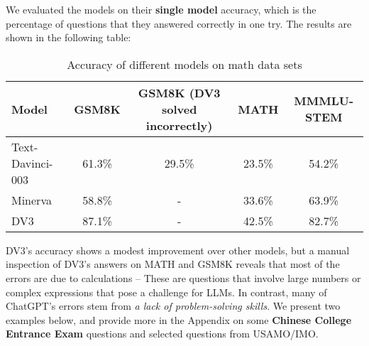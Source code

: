 We evaluated the models on their \textbf{single model} accuracy, which is the percentage of questions that they answered correctly in one try. The results are shown in the following table:

\begin{table}[h]
\centering
\begin{tabular}{lcccc}
\hline
Model & GSM8K & GSM8K (DV3 solved incorrectly) & MATH  & MMMLU-STEM\\
\hline
Text-Davinci-003 & 61.3\%  & 29.5\% & 23.5\% &54.2\% \\
Minerva & 58.8\% & - & 33.6\%& 63.9\% \\
DV3 & 87.1\% & -  & 42.5\%  & 82.7\% \\
\hline
\end{tabular}
\caption{Accuracy of different models on math data sets}
\label{tab:math}
\end{table}

DV3's accuracy shows a modest improvement over other models, but a manual inspection of DV3's answers on MATH and GSM8K reveals that most of the errors are due to calculations -- These are questions that involve large numbers or complex expressions that pose a challenge for LLMs. In contrast, many of ChatGPT's errors stem from \emph{a lack of problem-solving skills}. We present two examples below, and provide more in the Appendix on some \textbf{Chinese College Entrance Exam} questions and selected questions from USAMO/IMO.


